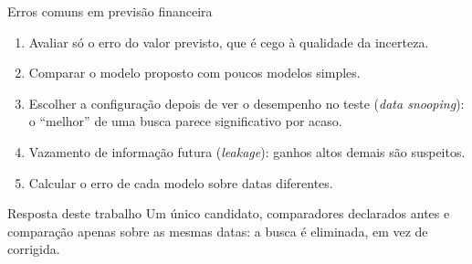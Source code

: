\documentclass[aspectratio=169,10pt]{beamer}
\begin{document}
\begin{frame}{Erros comuns em previsão financeira}
  \begin{enumerate}
    \item Avaliar só o erro do valor previsto, que é cego à qualidade da incerteza.
    \item Comparar o modelo proposto com poucos modelos simples.
    \item Escolher a configuração \alert{depois} de ver o desempenho no teste
      (\textit{data snooping}): o ``melhor'' de uma busca parece significativo por acaso.
    \item Vazamento de informação futura (\textit{leakage}): ganhos altos demais são suspeitos.
    \item Calcular o erro de cada modelo sobre datas diferentes.
  \end{enumerate}
  \vspace{6pt}
  \begin{block}{Resposta deste trabalho}
    Um único candidato, comparadores declarados antes e comparação apenas
    sobre as mesmas datas: a busca é eliminada, em vez de corrigida.
  \end{block}
\end{frame}
\end{document}
